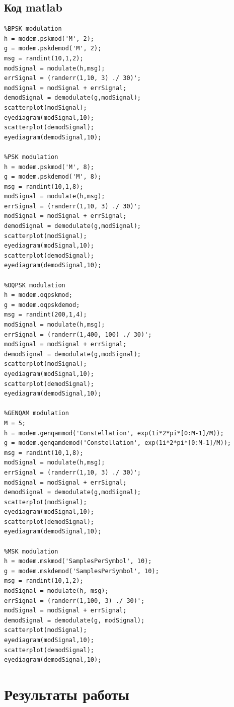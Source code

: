 \subsection{Код matlab}
\begin{lstlisting}
%BPSK modulation
h = modem.pskmod('M', 2);
g = modem.pskdemod('M', 2);
msg = randint(10,1,2);
modSignal = modulate(h,msg);
errSignal = (randerr(1,10, 3) ./ 30)';
modSignal = modSignal + errSignal;
demodSignal = demodulate(g,modSignal);
scatterplot(modSignal);
eyediagram(modSignal,10);
scatterplot(demodSignal);
eyediagram(demodSignal,10);

%PSK modulation
h = modem.pskmod('M', 8);
g = modem.pskdemod('M', 8);
msg = randint(10,1,8);
modSignal = modulate(h,msg);
errSignal = (randerr(1,10, 3) ./ 30)';
modSignal = modSignal + errSignal;
demodSignal = demodulate(g,modSignal);
scatterplot(modSignal);
eyediagram(modSignal,10);
scatterplot(demodSignal);
eyediagram(demodSignal,10);

%OQPSK modulation
h = modem.oqpskmod;
g = modem.oqpskdemod;
msg = randint(200,1,4);
modSignal = modulate(h,msg);
errSignal = (randerr(1,400, 100) ./ 30)';
modSignal = modSignal + errSignal;
demodSignal = demodulate(g,modSignal);
scatterplot(modSignal);
eyediagram(modSignal,10);
scatterplot(demodSignal);
eyediagram(demodSignal,10);

%GENQAM modulation
M = 5;
h = modem.genqammod('Constellation', exp(1i*2*pi*[0:M-1]/M));
g = modem.genqamdemod('Constellation', exp(1i*2*pi*[0:M-1]/M));
msg = randint(10,1,8);
modSignal = modulate(h,msg);
errSignal = (randerr(1,10, 3) ./ 30)';
modSignal = modSignal + errSignal;
demodSignal = demodulate(g,modSignal);
scatterplot(modSignal);
eyediagram(modSignal,10);
scatterplot(demodSignal);
eyediagram(demodSignal,10);

%MSK modulation
h = modem.mskmod('SamplesPerSymbol', 10);
g = modem.mskdemod('SamplesPerSymbol', 10);
msg = randint(10,1,2);
modSignal = modulate(h, msg);
errSignal = (randerr(1,100, 3) ./ 30)';
modSignal = modSignal + errSignal;
demodSignal = demodulate(g, modSignal);
scatterplot(modSignal);
eyediagram(modSignal,10);
scatterplot(demodSignal);
eyediagram(demodSignal,10);
\end{lstlisting}

\section{Результаты работы}

